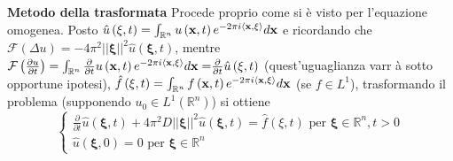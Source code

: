 \documentclass{article}
\begin{document}
\textbf{Metodo della trasformata} Procede proprio come si \`{e} visto per
l'equazione omogenea. Posto $\hat{u}\left( \mathbf{\xi },t\right) =\int_{%
\mathbb{R}
^{n}}u\left( \mathbf{x},t\right) e^{-2\pi i\left\langle \mathbf{x,\xi }%
\right\rangle }d\mathbf{x}$ e ricordando che $\mathcal{F}\left( \Delta
u\right) =-4\pi ^{2}\left\vert \left\vert \mathbf{\xi }\right\vert
\right\vert ^{2}\hat{u}\left( \mathbf{\xi },t\right) $, mentre $\mathcal{F}%
\left( \frac{\partial u}{\partial t}\right) =\int_{%
\mathbb{R}
^{n}}\frac{\partial }{\partial t}u\left( \mathbf{x},t\right) e^{-2\pi
i\left\langle \mathbf{x,\xi }\right\rangle }d\mathbf{x=}\frac{\partial }{%
\partial t}\hat{u}\left( \mathbf{\xi },t\right) $ (quest'uguaglianza varr%
\`{a} sotto opportune ipotesi), $\hat{f}\left( \mathbf{\xi },t\right) =\int_{%
\mathbb{R}
^{n}}f\left( \mathbf{x},t\right) e^{-2\pi i\left\langle \mathbf{x,\xi }%
\right\rangle }d\mathbf{x}$ (se $f\in L^{1}$), trasformando il problema
(supponendo $u_{0}\in L^{1}\left( 
\mathbb{R}
^{n}\right) $) si ottiene%
\begin{equation*}
\left\{ 
\begin{array}{c}
\frac{\partial }{\partial t}\hat{u}\left( \mathbf{\xi },t\right) +4\pi
^{2}D\left\vert \left\vert \mathbf{\xi }\right\vert \right\vert ^{2}\hat{u}%
\left( \mathbf{\xi },t\right) =\hat{f}\left( \xi ,t\right) \text{ per }%
\mathbf{\xi }\in 
\mathbb{R}
^{n},t>0 \\ 
\hat{u}\left( \mathbf{\xi },0\right) =0\text{ per }\mathbf{\xi }\in 
\mathbb{R}
^{n}%
\end{array}%
\right.
\end{equation*}
\end{document}
